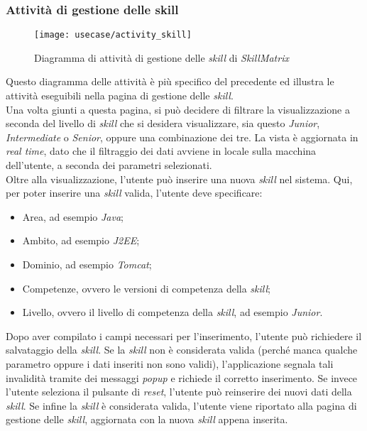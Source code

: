 \subsubsection{Attività di gestione delle skill}
\begin{figure}[!h] 
    \centering 
    \texttt{[image: usecase/activity\_skill]} 
    \caption{Diagramma di attività di gestione delle \emph{skill} di \emph{SkillMatrix}}
\end{figure}
Questo diagramma delle attività è più specifico del precedente ed illustra le attività eseguibili nella pagina di gestione delle \emph{skill}.\\
Una volta giunti a questa pagina, si può decidere di filtrare la visualizzazione a seconda del livello di \emph{skill} che si desidera visualizzare, sia questo \emph{Junior}, \emph{Intermediate} o \emph{Senior}, oppure una combinazione dei tre. La vista è aggiornata in \emph{real time}, dato che il filtraggio dei dati avviene in locale sulla macchina dell'utente, a seconda dei parametri selezionati.\\
Oltre alla visualizzazione, l'utente può inserire una nuova \emph{skill} nel sistema. Qui, per poter inserire una \emph{skill} valida, l'utente deve specificare:
\begin{itemize}
	\item Area, ad esempio \emph{Java};
	\item Ambito, ad esempio \emph{J2EE};
	\item Dominio, ad esempio \emph{Tomcat};
	\item Competenze, ovvero le versioni di competenza della \emph{skill};
	\item Livello, ovvero il livello di competenza della \emph{skill}, ad esempio \emph{Junior}.
\end{itemize}
Dopo aver compilato i campi necessari per l'inserimento, l'utente può richiedere il salvataggio della \emph{skill}. Se la \emph{skill} non è considerata valida (perché manca qualche parametro oppure i dati inseriti non sono validi), l'applicazione segnala tali invalidità tramite dei messaggi \emph{popup} e richiede il corretto inserimento. Se invece l'utente seleziona il pulsante di \emph{reset}, l'utente può reinserire dei nuovi dati della \emph{skill}. Se infine la \emph{skill} è considerata valida, l'utente viene riportato alla pagina di gestione delle \emph{skill}, aggiornata con la nuova \emph{skill} appena inserita.